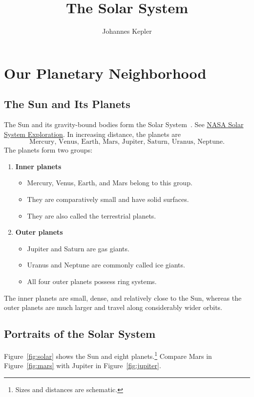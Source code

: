 \documentclass[10pt]{article}
\title{The Solar System}
\author[1]{Johannes Kepler}
\affil[1]{Imperial Mathematician, Prague}
\date{}
\begin{document}
\maketitle
\tableofcontents
\bigskip

\section{Our Planetary Neighborhood}

\subsection{The Sun and Its Planets}
The Sun and its gravity-bound bodies form the Solar System~\cite{kepler}.
See \href{https://solarsystem.nasa.gov/}{NASA Solar System Exploration}.
In increasing distance, the planets are
\[
  \text{Mercury, Venus, Earth, Mars, Jupiter, Saturn, Uranus, Neptune.}
\]
The planets form two groups:
\begin{enumerate}[label=(\Roman*)]
  \item \textbf{Inner planets}
    \begin{itemize}[label=$\dagger$]
      \item Mercury, Venus, Earth, and Mars belong to this group.
      \item They are comparatively small and have solid surfaces.
      \item They are also called the terrestrial planets.
    \end{itemize}
  \item \textbf{Outer planets}
    \begin{itemize}[label=$\dagger$]
      \item Jupiter and Saturn are gas giants.
      \item Uranus and Neptune are commonly called ice giants.
      \item All four outer planets possess ring systems.
    \end{itemize}
\end{enumerate}
The inner planets are small, dense, and relatively close to the Sun,
whereas the outer planets are much larger and travel along considerably
wider orbits.

\subsection{Portraits of the Solar System}
Figure~\ref{fig:solar} shows the Sun and eight planets.\footnote{Sizes and
distances are schematic.}
Compare Mars in Figure~\ref{fig:mars} with Jupiter in Figure~\ref{fig:jupiter}.
\end{document}
